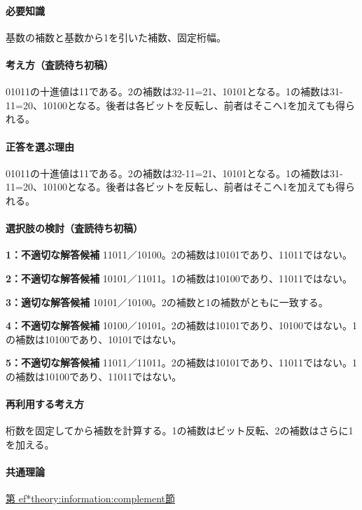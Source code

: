 \paragraph{必要知識} 基数の補数と基数から1を引いた補数、固定桁幅。

\paragraph{考え方（査読待ち初稿）} 01011の十進値は11である。2の補数は32-11=21、10101となる。1の補数は31-11=20、10100となる。後者は各ビットを反転し、前者はそこへ1を加えても得られる。

\paragraph{正答を選ぶ理由} 01011の十進値は11である。2の補数は32-11=21、10101となる。1の補数は31-11=20、10100となる。後者は各ビットを反転し、前者はそこへ1を加えても得られる。

\paragraph{選択肢の検討（査読待ち初稿）}

\noindent\textbf{1：不適切な解答候補} 11011／10100。2の補数は10101であり、11011ではない。\par

\noindent\textbf{2：不適切な解答候補} 10101／11011。1の補数は10100であり、11011ではない。\par

\noindent\textbf{3：適切な解答候補} 10101／10100。2の補数と1の補数がともに一致する。\par

\noindent\textbf{4：不適切な解答候補} 10100／10101。2の補数は10101であり、10100ではない。1の補数は10100であり、10101ではない。\par

\noindent\textbf{5：不適切な解答候補} 11011／11011。2の補数は10101であり、11011ではない。1の補数は10100であり、11011ではない。\par

\paragraph{再利用する考え方} 桁数を固定してから補数を計算する。1の補数はビット反転、2の補数はさらに1を加える。

\paragraph{共通理論} \hyperref[theory:information:complement]{第
ef*{theory:information:complement}節}

